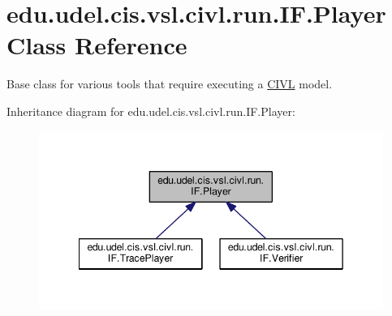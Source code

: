 \hypertarget{classedu_1_1udel_1_1cis_1_1vsl_1_1civl_1_1run_1_1IF_1_1Player}{}\section{edu.\+udel.\+cis.\+vsl.\+civl.\+run.\+I\+F.\+Player Class Reference}
\label{classedu_1_1udel_1_1cis_1_1vsl_1_1civl_1_1run_1_1IF_1_1Player}


Base class for various tools that require executing a \hyperlink{classedu_1_1udel_1_1cis_1_1vsl_1_1civl_1_1CIVL}{C\+I\+V\+L} model.  




Inheritance diagram for edu.\+udel.\+cis.\+vsl.\+civl.\+run.\+I\+F.\+Player\+:
\nopagebreak
\begin{figure}[H]
\begin{center}
\leavevmode
\includegraphics[width=342pt]{classedu_1_1udel_1_1cis_1_1vsl_1_1civl_1_1run_1_1IF_1_1Player__inherit__graph}
\end{center}
\end{figure}


